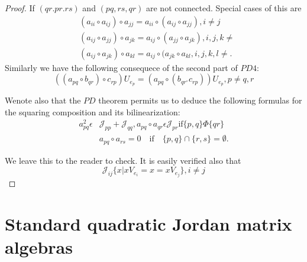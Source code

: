 \begin{proof}
If $(qr. pr. rs)$ and $(pq, rs, qr)$ are not connected. Special
cases of this are
\begin{align*}
&(a_{ii}\circ a_{ij})\circ a_{jj}=a_{ii}\circ(a_{ij}\circ a_{jj}),i\neq
  j\tag{23}\label{c2:eq23}\\
&(a_{ij}\circ a_{jj})\circ a_{jk}=a_{ij}\circ (a_{jj}\circ a_{jk}),
   i,j,k\neq\tag{24}\label{c2:eq24}\\
&(a_{ij}\circ a_{jk})\circ a_{kl} =a_{ij}\circ (a_{jk}\circ a_{kl},
    i,j,k, l\neq.\tag{25}\label{c2:eq25}
\end{align*}
Similarly we have the following consequece of the second part of
$PD4$:
\begin{equation*}
((a_{pq}\circ b_{qr})\circ
  c_{rp})U_{e_{p}}=(a_{pq}\circ(b_{qr^{\circ}}c_{rp}))U_{e_{p}},p\neq
  q,r\tag{26}\label{c2:eq26} 
\end{equation*}

We\pageoriginale note also that the $PD$ theorem permits us to deduce
the following formulas for the squaring composition and its
bilinearization:
\begin{align*}
a^{2}_{pq}\epsilon &\mathscr{J}_{pp}+\mathscr{J}_{qq},a_{pq}\circ
a_{qr}\epsilon
\mathscr{J}_{pr}\text{if}\{p,q\}\Phi\{qr\}\tag{27}\label{c2:eq27} \\
&a_{pq}\circ a_{rs}=0\quad\text{if}\quad\{p,q\}\cap\{r,s\}=\emptyset.
\end{align*}

We leave this to the reader to check. It is easily verified also that 
\begin{equation*}
\mathscr{J}_{ij}\{x|xV_{e_{i}}=x=xV_{e_{j}}\},i\neq j\tag{28}\label{c2:eq28}
\end{equation*}
 \end{proof}

\section{Standard quadratic Jordan matrix algebras}\label{c2:sec2}

